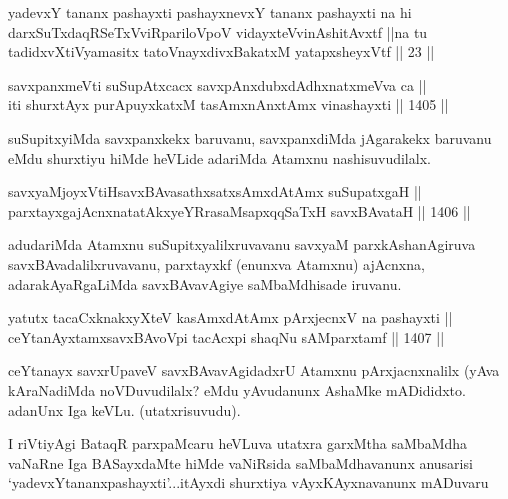 \begin{shl}
yadevxY tananx pashayxti pashayxnevxY tananx pashayxti na hi darxSuTxdaqRSeTxVviRpariloVpoV vidayxteV\s vinAshitAvxtf ||na tu tadidxvXtiVyamasitx tatoV\s nayxdivxBakatxM yatapxsheyxVtf || 23 ||
\end{shl}


\begin{shl}
savxpanxmeVti suSupAtxcacx savxpAnxdubxdAdhxnatxmeVva ca || \\
iti shurxtAyx purA\s puyxkatxM tasAmxnAnx\s \s tAmx vinashayxti \hfill || 1405 ||  
\end{shl}

\begin{artha}
suSupitxyiMda savxpanxkekx baruvanu, savxpanxdiMda jAgarakekx baruvanu eMdu shurxtiyu hiMde heVLide adariMda Atamxnu nashisuvudilalx.
\end{artha}


\begin{shl}
savxyaMjoyxVtiHsavxBAvasathxsatxsAmxdAtAmx suSupatxgaH || \\
parxtayxgajAcnxnatatAkxyeYRrasaMsapxqqSaTxH savxBAvataH \hfill || 1406 ||  
\end{shl}

\begin{artha}
adudariMda Atamxnu suSupitxyalilxruvavanu savxyaM parxkAshanAgiruva savxBAvadalilxruvavanu, parxtayxkf (enunxva Atamxnu) ajAcnxna, adarakAyaRgaLiMda savxBAvavAgiye saMbaMdhisade iruvanu.
\end{artha}

\begin{shl}
yatutx tacaCxknakxyXteV kasAmxdAtAmx pArxjecnxV na pashayxti || \\
ceYtanAyxtamxsavxBAvoV\s pi tacAcxpi shaqNu sAMparxtamf \hfill || 1407 ||  
\end{shl}

\begin{artha}
ceYtanayx savxrUpaveV savxBAvavAgidadxrU Atamxnu pArxjacnxnalilx (yAva kAraNadiMda noVDuvudilalx? eMdu yAvudanunx AshaMke mADididxto. adanUnx Iga keVLu. (utatxrisuvudu).
\end{artha}

\begin{artha}
I riVtiyAgi BataqR parxpaMcaru heVLuva utatxra garxMtha saMbaMdha vaNaRne Iga BASayxdaMte hiMde vaNiRsida saMbaMdhavanunx anusarisi `yadevxYtananxpashayxti'...itAyxdi shurxtiya vAyxKAyxnavanunx mADuvaru
\end{artha}

